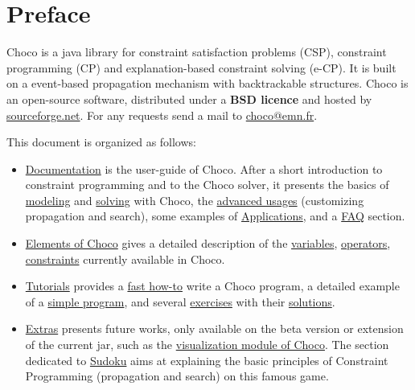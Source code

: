 \chapter*{Preface}
Choco is a java library for constraint satisfaction problems (CSP), constraint programming (CP) and explanation-based constraint solving (e-CP). It is built on a event-based propagation mechanism with backtrackable structures.
Choco is an open-source software, distributed under a \textbf{BSD licence} and hosted by \href{http://sourceforge.net/projects/choco/}{sourceforge.net}.
For any requests send a mail to \url{choco@emn.fr}.
\bigskip

\noindent This document is organized as follows:
\begin{itemize}
\item \hyperlink{ch:doc}{Documentation} is the user-guide of Choco. After a short \hypertarget{doc:introduction}{introduction} to constraint programming and to the Choco solver, it presents the basics of \hyperlink{doc:model}{modeling} and \hyperlink{doc:solver}{solving} with Choco, the \hyperlink{doc:advanced}{advanced usages} (customizing propagation and search), some examples of \hyperlink{doc:applications}{Applications}, and a \hyperlink{faq:frequentlyaskedquestions}{FAQ} section.
\item \hyperlink{part:elements}{Elements of Choco} gives a detailed description of the \hyperlink{ch:vars}{variables}, \hyperlink{ch:operators}{operators}, \hyperlink{ch:constraints}{constraints} currently available in Choco.
\item \hyperlink{ch:tut}{Tutorials} provides a \hyperlink{gettingstarted:gettingstarted:welcometochoco}{fast how-to} write a Choco program, a detailed example of a \hyperlink{gettingstarted:firstexample:magicsquare}{simple program}, and several \hyperlink{exercises}{exercises} with their \hyperlink{solutions}{solutions}.
\item \hyperlink{ch:extra}{Extras} presents future works, only available on the beta version or extension of the current jar, such as the \hyperlink{chocoandvisu:chocoandvisu}{visualization module of Choco}. The section dedicated to \hyperlink{sudokuandcp:sudokuandconstraintprogramming}{Sudoku} aims at explaining the basic principles of Constraint Programming (propagation and search) on this famous game.

\end{itemize}

